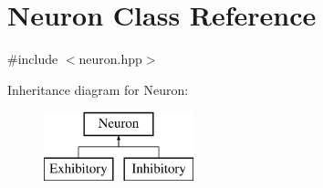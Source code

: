 \section{Neuron Class Reference}
\label{class_neuron}


{\ttfamily \#include $<$neuron.\+hpp$>$}

Inheritance diagram for Neuron\+:\begin{figure}[H]
\begin{center}
\leavevmode
\includegraphics[height=2.000000cm]{class_neuron}
\end{center}
\end{figure}
